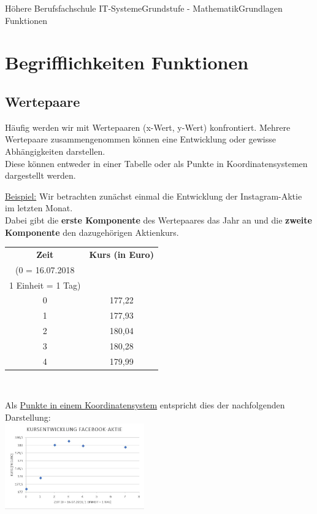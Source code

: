 \documentclass[11pt,twocolumn,oneside,openany,headings=optiontotoc,11pt,numbers=noenddot]{article}
\begin{document}
	\begin{worksheet}{Höhere Berufsfachschule IT-Systeme}{Grundstufe - Mathematik}{Grundlagen Funktionen}
		\setcounter{section}{0}
		\section{Begrifflichkeiten Funktionen}
		\subsection{Wertepaare} Häufig werden wir mit Wertepaaren (x-Wert, y-Wert) konfrontiert. Mehrere Wertepaare zusammengenommen können eine Entwicklung oder gewisse Abhängigkeiten darstellen.\\
		Diese können entweder in einer Tabelle oder als Punkte in Koordinatensystemen dargestellt werden.\\
		\par\bigskip\noindent
		\underline{Beispiel:} Wir betrachten zunächst einmal die Entwicklung der Instagram-Aktie im letzten Monat.\\
		Dabei gibt die \textbf{erste Komponente} des Wertepaares das Jahr an und die \textbf{zweite Komponente} den dazugehörigen Aktienkurs.\\
		\par\bigskip\noindent
		\begin{tabularx}{0.45\textwidth}{c|c}
			\textbf{Zeit} & \textbf{Kurs (in Euro)}\\
			(0 = 16.07.2018 & \\
			1 Einheit = 1 Tag) & \\
			\hline
			0 & 177,22\\
			\hline
			1 & 177,93\\
			\hline
			2 & 180,04\\
			\hline
			3 & 180,28\\
			\hline
			4 & 179,99\\
			\hline
		\end{tabularx}\\
		\par\noindent
		Als \underline{Punkte in einem Koordinatensystem} entspricht dies der nachfolgenden Darstellung:\\
		\includegraphics[width=0.45\textwidth]{../99_Bilder/fb.jpg}\\

\end{worksheet}
\end{document}
